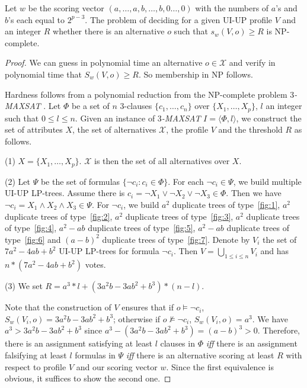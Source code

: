 \begin{thm}
	Let $w$ be the scoring vector $(a,\ldots,a, b,\ldots,b, 0\ldots,0)$ with the numbers of 
	$a$'s and $b$'s each equal to $2^{p-3}$.  The problem of deciding for a given UI-UP profile 
	$V$ and an integer $R$ whether there is an alternative
	$o$ such that $s_w(V,o) \geq R$ is NP-complete.
\end{thm}
\begin{proof}
  We can guess in polynomial time an alternative $o \in \mathcal{X}$ and 
  verify in polynomial time that $S_w(V, o) \geq R$.  So membership in NP follows.

  Hardness follows from a polynomial reduction from the NP-complete 
  problem 3\textit{-MAXSAT} \cite{Papadimitriou:1988}.
  Let $\Phi$ be a set of $n$ 3-clauses $\{ c_1,\ldots,c_n \}$ over $\{ X_1,\ldots,X_p \}$, 
  $l$ an integer such that $0 \leq l \leq n$.
  Given an instance of 3\textit{-MAXSAT} $I=\langle \Phi, l \rangle$, we construct the set of attributes 
  $X$, the set of alternatives $\mathcal{X}$, the profile $V$ and the threshold $R$ as follows.

  (1) $X = \{ X_1,\ldots,X_p \}$.  $\mathcal{X}$ is then the set of 
      all alternatives over $X$.

  (2) Let $\Psi$ be the set of formulas $\{ \neg c_i:c_i \in \Phi \}$.  For each 
      $\neg c_i \in \Psi$, we build multiple UI-UP LP-trees.  Assume there is $c_i = 
      \neg X_1 \vee \neg X_2 \vee \neg X_3 \in \Phi$. Then we have $\neg c_i = X_1 \wedge 
      X_2 \wedge X_3 \in \Psi$.  For $\neg c_i$, we build $a^2$ duplicate trees of 
      type~\ref{fig:1}, $a^2$ duplicate trees of type~\ref{fig:2}, $a^2$ duplicate 
      trees of type~\ref{fig:3}, $a^2$ duplicate trees of type~\ref{fig:4}, 
      $a^2-ab$ duplicate trees of type~\ref{fig:5}, 
      $a^2-ab$ duplicate trees of type~\ref{fig:6} and 
      $(a-b)^2$ duplicate trees of type~\ref{fig:7}. 
      Denote by $V_i$ the set of $7a^2-4ab+b^2$ UI-UP LP-trees for formula 
      $\neg c_i$.  Then $V = \bigcup_{1 \leq i \leq n} V_i$ and has 
      $n*(7a^2-4ab+b^2)$ votes.

  (3) We set $R = a^3*l+(3a^2b-3ab^2+b^3)*(n-l)$.

  Note that the construction of $V$ ensures that if $o \models \neg c_i$, $S_w(V_i, o)=
  3a^2b-3ab^2+b^3$; 
  otherwise if $o \not \models \neg c_i$, $S_w(V_i, o)=a^3$.  
  We have $a^3 > 3a^2b-3ab^2+b^3$ since 
  $a^3-(3a^2b-3ab^2+b^3)=(a-b)^3 > 0$.
  Therefore, there is an assignment 
  satisfying at least $l$ clauses in $\Phi$ \textit{iff} there is an assignment falsifying 
  at least $l$ formulas in $\Psi$ \textit{iff} there is an alternative scoring at least 
  $R$ with respect to profile $V$ and our scoring vector $w$.
	Since the first equivalence is obvious, it suffices to show the second one.


\end{proof}
